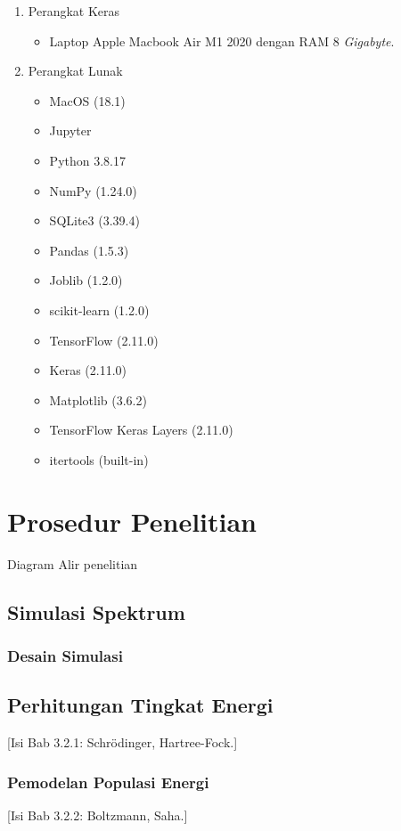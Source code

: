 \begin{enumerate}
\item Perangkat Keras
	\begin{itemize}
	\item Laptop Apple Macbook Air M1 2020 dengan RAM 8 \textit{Gigabyte}.
    \end{itemize}
\item Perangkat Lunak
	\begin{itemize}
	\item MacOS (18.1)
	\item Jupyter 
	\item Python 3.8.17
    \item NumPy (1.24.0)
    \item SQLite3 (3.39.4)
    \item Pandas (1.5.3)
    \item Joblib (1.2.0)
    \item scikit-learn (1.2.0)
    \item TensorFlow (2.11.0)
    \item Keras (2.11.0)
    \item Matplotlib (3.6.2)
    \item TensorFlow Keras Layers (2.11.0)
    \item itertools (built-in)
	\end{itemize}
\end{enumerate}

\section{Prosedur Penelitian}

\par Diagram Alir penelitian
\subsection{Simulasi Spektrum}

\subsubsection{Desain Simulasi}
\subsection{Perhitungan Tingkat Energi}
[Isi Bab 3.2.1: Schrödinger, Hartree-Fock.]

\subsubsection{Pemodelan Populasi Energi}
[Isi Bab 3.2.2: Boltzmann, Saha.]

